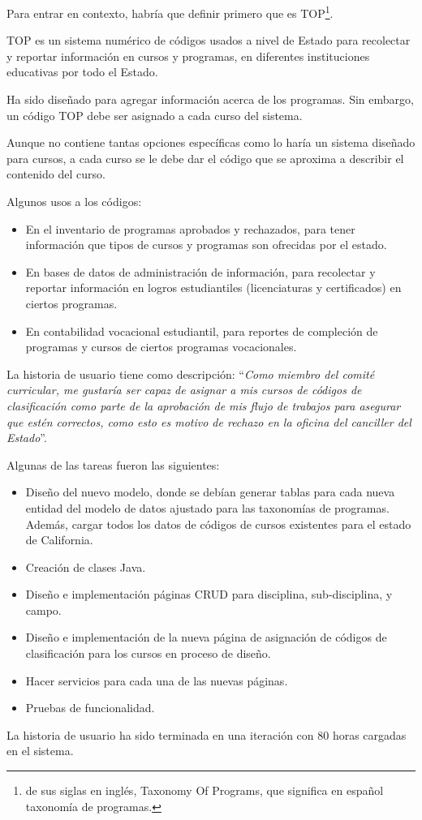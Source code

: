 Para entrar en contexto, habría que definir primero que es TOP\footnote{de sus siglas en inglés, Taxonomy Of Programs, que significa en español taxonomía de programas.}.

TOP es un sistema numérico de códigos usados a nivel de Estado para recolectar y reportar información en cursos y programas, en diferentes instituciones educativas \citep{brice_w_harris_program_2013} por todo el Estado. 

Ha sido diseñado para agregar información acerca de los programas. Sin embargo, un código TOP debe ser asignado a cada curso del sistema. 

Aunque no contiene tantas opciones específicas como lo haría un sistema diseñado para cursos, a cada curso se le debe dar el código que se aproxima a describir el contenido del curso.

Algunos usos a los códigos:
\begin{itemize}
	\item En el inventario de programas aprobados y rechazados, para tener información que tipos de cursos y programas son ofrecidas por el estado.
	\item En bases de datos de administración de información, para recolectar y reportar información en logros estudiantiles (licenciaturas y certificados) en ciertos programas.
	\item En contabilidad vocacional estudiantil, para reportes de compleción de programas y cursos de ciertos programas vocacionales.
\end{itemize}

La historia de usuario tiene como descripción: \enquote{\textit{Como miembro del comité curricular, me gustaría ser capaz de asignar a mis cursos de códigos de clasificación como parte de la aprobación de mis flujo de trabajos para asegurar que estén correctos, como esto es motivo de rechazo en la oficina del canciller del Estado}}.

Algunas de las tareas fueron las siguientes:
\begin{itemize}
	\item Diseño del nuevo modelo, donde se debían generar tablas para cada nueva entidad del modelo de datos ajustado para las taxonomías de programas. Además, cargar todos los datos de códigos de cursos existentes para el estado de California.
	\item Creación de clases Java.
	\item Diseño e implementación páginas CRUD para disciplina, sub-disciplina, y campo.
	\item Diseño e implementación de la nueva página de asignación de códigos de clasificación para los cursos en proceso de diseño.
	\item Hacer servicios para cada una de las nuevas páginas.
	\item Pruebas de funcionalidad.
\end{itemize}

La historia de usuario ha sido terminada en una iteración con 80 horas cargadas en el sistema.